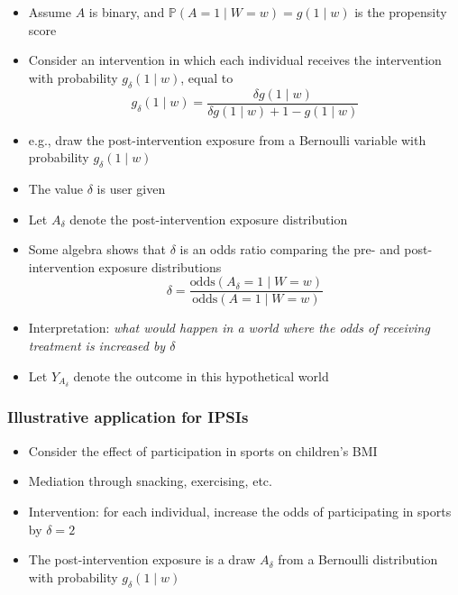 \documentclass[
  12pt,
]{book}
\providecommand{\tightlist}{%
  \setlength{\itemsep}{0pt}\setlength{\parskip}{0pt}}
\theoremstyle{definition}
\theoremstyle{definition}
\theoremstyle{definition}
\renewcommand{\P}{\mathbb{P}}
\newcommand{\1}{\mathbbm{1}}
\begin{document}
\begin{itemize}
\tightlist
\item
  Assume \(A\) is binary, and \(\P(A=1\mid W=w) = g(1\mid w)\) is the propensity score
\item
  Consider an intervention in which each individual receives the intervention
  with probability \(g_\delta(1\mid w)\), equal to
  \begin{equation*}
    g_\delta(1\mid w)=\frac{\delta g(1\mid w)}{\delta g(1\mid w) +
    1 - g(1\mid w)}
  \end{equation*}
\item
  e.g., draw the post-intervention exposure from a Bernoulli variable with
  probability \(g_\delta(1\mid w)\)
\item
  The value \(\delta\) is user given
\item
  Let \(A_\delta\) denote the post-intervention exposure distribution
\item
  Some algebra shows that \(\delta\) is an odds ratio comparing the pre- and
  post-intervention exposure distributions
  \begin{equation*}
    \delta = \frac{\text{odds}(A_\delta = 1\mid W=w)}
    {\text{odds}(A = 1\mid W=w)}
  \end{equation*}
\item
  Interpretation: \emph{what would happen in a
  world where the odds of receiving treatment is increased by \(\delta\)}
\item
  Let \(Y_{A_\delta}\) denote the outcome in this hypothetical world
\end{itemize}

\hypertarget{illustrative-application-for-ipsis}{%
\subsubsection{Illustrative application for IPSIs}\label{illustrative-application-for-ipsis}}

\begin{itemize}
\tightlist
\item
  Consider the effect of participation in sports on children's BMI
\item
  Mediation through snacking, exercising, etc.
\item
  Intervention: for each individual, increase the odds of participating in
  sports by \(\delta=2\)
\item
  The post-intervention exposure is a draw \(A_\delta\) from a Bernoulli
  distribution with probability \(g_\delta(1\mid w)\)
\end{itemize}
\end{document}
